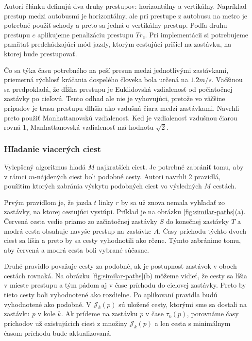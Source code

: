 Autori článku definujú dva druhy prestupov: horizontálny a vertikálny. Napríklad prestup medzi autobusmi je horizontálny, ale pri prestupe z autobusu na metro je potrebné použiť schody a preto sa jedná o vertikálny prestup. Podľa druhu prestupu $c$ aplikujeme penalizáciu prestupu $Tr_c$. Pri implementácii si potrebujeme pamätať predchádzajúci mód jazdy, ktorým cestujúci prišiel na zastávku, na ktorej bude prestupovať.

Čo sa týka času potrebného na peší presun medzi jednotlivými zastávkami, priemerná rýchlosť kráčania dospelého človeka bola určená na $1.2 m/s$. Väčšinou sa predpokladá, že dĺžka prestupu je Euklidovská vzdialenosť od počiatočnej zastávky po cieľovú. Tento odhad ale nie je vyhovujúci, pretože vo väčšine prípadov je trasa prestupu dlhšia ako vzdušná čiara medzi zastávkami. Navrhli preto použiť Manhattanovskú vzdialenosť. Keď je vzdialenosť vzdušnou čiarou rovná 1, Manhattanovská vzdialenosť má hodnotu $\sqrt{2}$.

\subsubsection{Hľadanie viacerých ciest}
Vylepšený algoritmus hľadá $M$ najkratších ciest. Je potrebné zabrániť tomu, aby v rámci $m$-nájdených ciest boli podobné cesty. Autori navrhli 2 pravidlá, použitím ktorých zabránia výskytu podobných ciest vo výsledných $M$ cestách.

Prvým pravidlom je, že jazda $t$ linky $r$ by sa už znova nemala vyhľadať zo zastávky, na ktorej cestujúci vystúpi. Príklad je na obrázku \ref{fig:similar-paths}(a). Červená cesta vedie priamo zo začiatočnej zastávky $S$ do konečnej zastávky $T$ a modrá cesta obsahuje navyše prestup na zastávke $A$. Časy príchodu týchto dvoch ciest sa líšia a preto by sa cesty vyhodnotili ako rôzne. Týmto zabránime tomu, aby červená a modrá cesta boli vybrané súčasne.

Druhé pravidlo považuje cesty za podobné, ak je postupnosť zastávok v oboch cestách rovnaká. Na obrázku \ref{fig:similar-paths}(b) môžeme vidieť, že cesty sa líšia v mieste prestupu a tým pádom aj v čase príchodu do cieľovej zastávky. Preto by tieto cesty boli vyhodnotené ako rozdielne. Po aplikovaní pravidla budú vyhodnotené ako podobné. 
V $\mathcal{J}_k(p)$ sú uložené cesty, ktorými sme sa dostali na zastávku $p$ v kole $k$. Ak prídeme na zastávku $p$ v čase $\tau_k(p)$, porovnáme časy príchodov už existujúcich ciest z množiny $\mathcal{J}_k(p)$ a len cesta s minimálnym časom príchodu bude aktualizovaná.

